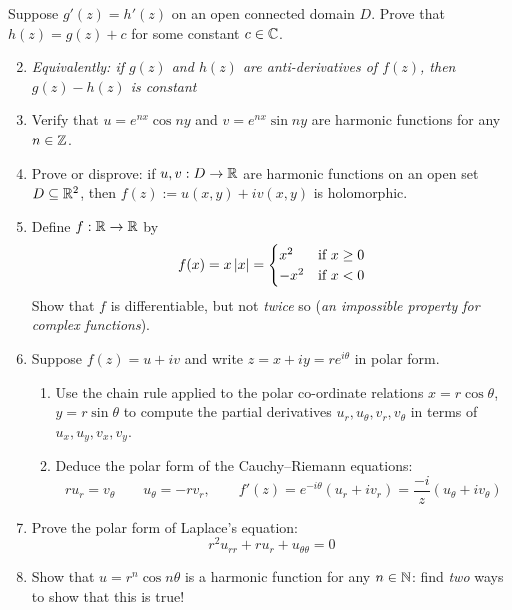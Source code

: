 \begin{exercises}{}
	\exstart Suppose $g'(z)=h'(z)$  on an open connected domain $D$. Prove that $h(z)=g(z)+c$ for some constant $c\in\mathbb{C}$.\vspace{-5pt}
	\begin{enumerate}\setcounter{enumi}{1}
	  \item[]\emph{Equivalently: if $g(z)$ and $h(z)$ are anti-derivatives of $f(z)$, then $g(z)-h(z)$ is constant}
	  
	  
	  \item Verify that $u=e^{nx}\cos ny$ and $v=e^{nx}\sin ny$ are harmonic functions for any $n\in\mathbb{Z}$.
	  
	  
	  \item Prove or disprove: if $u,v:D\to\mathbb{R}$ are harmonic functions on an open set $D\subseteq\mathbb{R}^2$, then $f(z):=u(x,y)+iv(x,y)$ is holomorphic.
	  
	  
	  \item\label{exs:realoncediff} Define $f:\mathbb{R}\to\mathbb{R}$ by
		\[
			f(x)=x\left| x\right|=
			\begin{cases}
				x^2&\text{if }x\ge 0\\
				-x^2&\text{if }x<0
			\end{cases}
		\]
		Show that $f$ is differentiable, but not \emph{twice} so (\emph{an impossible property for complex functions}).

	  
	  \item\label{exs:crpolar} Suppose $f(z)=u+iv$ and write $z=x+iy=re^{i\theta}$ in polar form.
	  \begin{enumerate}
	    \item Use the chain rule applied to the polar co-ordinate relations $x=r\cos\theta$, $y=r\sin\theta$ to compute the partial derivatives $u_r,u_\theta,v_r,v_\theta$ in terms of $u_x,u_y,v_x,v_y$.
	    
	  	\item Deduce the polar form of the Cauchy--Riemann equations:
			\[
				ru_r=v_\theta\qquad u_\theta=-rv_r,\qquad f'(z)=e^{-i\theta}(u_r+iv_r) =\frac{-i}{z}(u_\theta+iv_\theta)
			\]
		\end{enumerate}
		
		
		\item Prove the polar form of Laplace's equation:
		\[
			r^2u_{rr}+ru_r+u_{\theta\theta}=0
		\]
			
			
		\item Show that $u=r^n\cos n\theta$ is a harmonic function for any $n\in\mathbb{N}$: find \emph{two} ways to show that this is true!
		

\end{enumerate}
\end{exercises}
